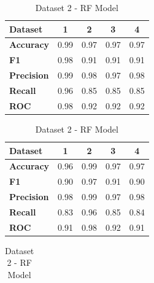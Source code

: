 \begin{table}[H]
  \centering
  \caption{RF model cross-performance results}\label{tab:rf_model_cross-performance_results}
  \begin{subtable}[H]{0.45\textwidth}
    \centering
    \begin{tabular}{|l|c|c|c|c|}
      \hline
      \textbf{Dataset}   & \textbf{1} & \textbf{2} & \textbf{3} & \textbf{4} \\
      \hline
      \textbf{Accuracy}  & 0.99       & 0.97       & 0.97       & 0.97       \\
      \textbf{F1}        & 0.98       & 0.91       & 0.91       & 0.91       \\
      \textbf{Precision} & 0.99       & 0.98       & 0.97       & 0.98       \\
      \textbf{Recall}    & 0.96       & 0.85       & 0.85       & 0.85       \\
      \textbf{ROC}       & 0.98       & 0.92       & 0.92       & 0.92       \\
      \hline
    \end{tabular}
    \caption{Dataset 1 - RF Model}\label{subtab:dataset_1_rf_model}
  \end{subtable}
  \quad
  \begin{subtable}[H]{0.45\textwidth}
    \centering
    \begin{tabular}{|l|c|c|c|c|}
      \hline
      \textbf{Dataset}   & \textbf{1} & \textbf{2} & \textbf{3} & \textbf{4} \\
      \hline
      \textbf{Accuracy}  & 0.96       & 0.99       & 0.97       & 0.97       \\
      \textbf{F1}        & 0.90       & 0.97       & 0.91       & 0.90       \\
      \textbf{Precision} & 0.98       & 0.99       & 0.97       & 0.98       \\
      \textbf{Recall}    & 0.83       & 0.96       & 0.85       & 0.84       \\
      \textbf{ROC}       & 0.91       & 0.98       & 0.92       & 0.91       \\
      \hline
    \end{tabular}
    \caption{Dataset 2 - RF Model}\label{subtab:dataset_2_rf_model}
  \end{subtable}
  \quad
  \begin{subtable}[H]{0.45\textwidth}
    \centering
    \begin{tabular}{|l|c|c|c|c|}

\end{tabular}
\end{subtable}
\end{table}
